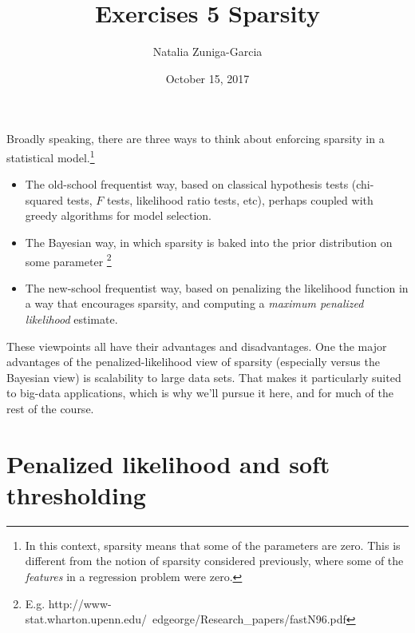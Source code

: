 \documentclass[11 pt]{article}
\author{Natalia Zuniga-Garcia}
\title{Exercises 5 Sparsity}
\date{October 15, 2017}
\begin{document}
\maketitle


Broadly speaking, there are three ways to think about enforcing sparsity in a statistical model.\footnote{In this context, sparsity means that some of the parameters are zero.  This is different from the notion of sparsity considered previously, where some of the \textit{features} in a regression problem were zero.}
\begin{itemize}
	\item The old-school frequentist way, based on classical hypothesis tests (chi-squared tests, $F$ tests, likelihood ratio tests, etc), perhaps coupled with greedy algorithms for model selection.
	\item The Bayesian way, in which sparsity is baked into the prior distribution on some parameter \footnote{E.g. http://www-stat.wharton.upenn.edu/~edgeorge/Research\_papers/fastN96.pdf}
	\item The new-school frequentist way, based on penalizing the likelihood function in a way that encourages sparsity, and computing a \textit{maximum penalized likelihood} estimate.
\end{itemize}

These viewpoints all have their advantages and disadvantages.  One the major advantages of the penalized-likelihood view of sparsity (especially versus the Bayesian view) is scalability to large data sets.  That makes it particularly suited to big-data applications, which is why we'll pursue it here, and for much of the rest of the course.

\section{Penalized likelihood and soft thresholding}
\end{document}

